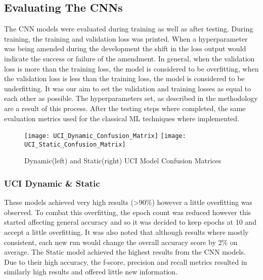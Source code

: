 \subsection{Evaluating The CNNs}
The CNN models were evaluated during training as well as after testing.
During training, the training and validation loss was printed.
When a hyperparameter was being amended during the development the shift in the loss output would indicate the success or failure of the amendment.
In general, when the validation loss is more than the training loss, the model is considered to be overfitting, when the validation loss is less than the training loss, the model is considered to be underfitting.
It was our aim to set the validation and training losses as equal to each other as possible.
The hyperparameters set, as described in the methodology are a result of this process.
After the testing steps where completed, the same evaluation metrics used for the classical ML techniques where implemented.

\begin{figure}[h]
\centering
\texttt{[image: UCI\_Dynamic\_Confusion\_Matrix]}\hfill
\texttt{[image: UCI\_Static\_Confusion\_Matrix]}\hfill
\caption*{Dynamic(left) and Static(right) UCI Model Confusion Matrices}
\label{UCI_Confusions}
\end{figure}

\subsubsection{UCI Dynamic \& Static}
These models achieved very high results (>90\%) however a little overfitting was observed.
To combat this overfitting, the epoch count was reduced however this started affecting general accuracy and so it was decided to keep epochs at 10 and accept a little overfitting.
It was also noted that although results where mostly consistent, each new run would change the overall accuracy score by 2\% on average.
The Static model achieved the highest results from the CNN models.
Due to their high accuracy, the f-score, precision and recall metrics resulted in similarly high results and offered little new information.


